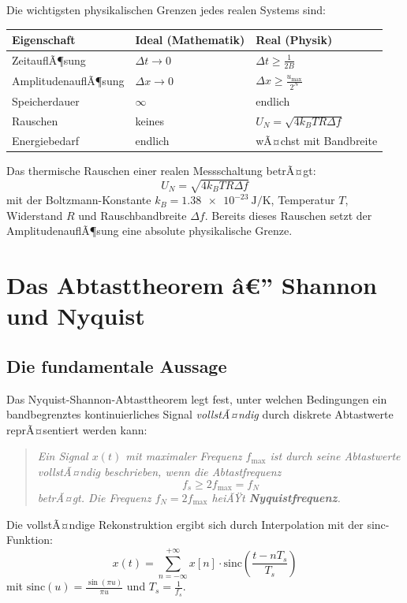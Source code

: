 ﻿\documentclass[12pt,a4paper,titlepage]{report}
\begin{document}
Die wichtigsten physikalischen Grenzen jedes realen Systems sind:

\begin{center}
\begin{tabular}{lll}
\toprule
\textbf{Eigenschaft} & \textbf{Ideal (Mathematik)} & \textbf{Real (Physik)} \\
\midrule
ZeitauflÃ¶sung & $\Delta t \to 0$ & $\Delta t \geq \frac{1}{2B}$ \\
AmplitudenauflÃ¶sung & $\Delta x \to 0$ & $\Delta x \geq \frac{u_{\max}}{2^N}$ \\
Speicherdauer & $\infty$ & endlich \\
Rauschen & keines & $U_N = \sqrt{4k_B T R \Delta f}$ \\
Energiebedarf & endlich & wÃ¤chst mit Bandbreite \\
\bottomrule
\end{tabular}
\end{center}

Das thermische Rauschen einer realen Messschaltung betrÃ¤gt:
\[
	U_N = \sqrt{4 k_B T R \Delta f}
\]
mit der Boltzmann-Konstante $k_B = \SI{1.38e-23}{\joule\per\kelvin}$, 
Temperatur $T$, Widerstand $R$ und Rauschbandbreite $\Delta f$.
Bereits dieses Rauschen setzt der AmplitudenauflÃ¶sung eine absolute physikalische Grenze.

\chapter{Das Abtasttheorem â€” Shannon und Nyquist}

\section{Die fundamentale Aussage}

Das Nyquist-Shannon-Abtasttheorem legt fest, unter welchen Bedingungen 
ein bandbegrenztes kontinuierliches Signal \emph{vollstÃ¤ndig} durch 
diskrete Abtastwerte reprÃ¤sentiert werden kann:

\begin{quote}
\itshape
Ein Signal $x(t)$ mit maximaler Frequenz $f_{\max}$ 
ist durch seine Abtastwerte vollstÃ¤ndig beschrieben, 
wenn die Abtastfrequenz
\[
	f_s \geq 2 f_{\max} = f_N
\]
betrÃ¤gt. Die Frequenz $f_N = 2f_{\max}$ heiÃŸt \textbf{Nyquistfrequenz}.
\end{quote}

Die vollstÃ¤ndige Rekonstruktion ergibt sich durch Interpolation mit der sinc-Funktion:
\[
	x(t) = \sum_{n=-\infty}^{+\infty} x[n] \cdot \mathrm{sinc}\!\left(\frac{t - nT_s}{T_s}\right)
\]
mit $\mathrm{sinc}(u) = \frac{\sin(\pi u)}{\pi u}$ und $T_s = \frac{1}{f_s}$.
\end{document}
